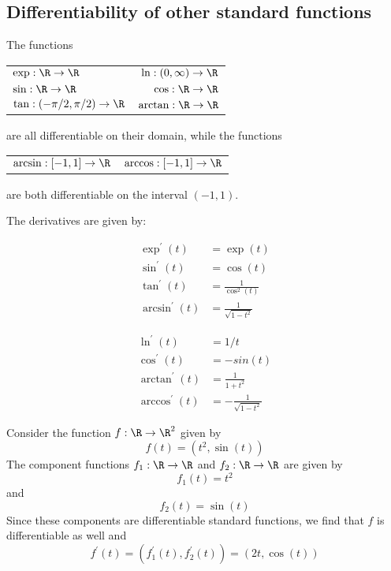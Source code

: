 \subsection{Differentiability of other standard functions}
\begin{proposition}
    The functions
    \begin{center}
        \begin{tabular}{l r}
            $\exp:\R\to\R$ & $\ln:(0,\infty) \to \R$ \\
            $\sin:\R\to\R$ & $\cos:\R\to\R$ \\
            $\tan:(-\pi/2,\pi/2)\to\R$ & $\arctan:\R\to\R$
        \end{tabular}
    \end{center}
    are all differentiable on their domain, while the functions
    \begin{center}
        \begin{tabular}{l r}
            $\arcsin:[-1,1] \to \R$ & $\arccos:[-1,1] \to \R$
        \end{tabular}
    \end{center}
    are both differentiable on the interval $(-1,1)$.

    The derivatives are given by: \newline
    \begin{minipage}{.5\linewidth}
        \begin{align*}
            \exp^\prime(t) &= \exp(t) \\
            \sin^\prime(t) &= \cos(t) \\
            \tan^\prime(t) &= \frac{1}{\cos^2(t)} \\
            \arcsin^\prime(t) &= \frac{1}{\sqrt{1-t^2}}
        \end{align*}
    \end{minipage}
    \begin{minipage}{.5\linewidth}
        \begin{align*}
            \ln^\prime(t) &= 1/t \\
            \cos^\prime(t) &= -sin(t) \\
            \arctan^\prime(t) &= \frac{1}{1+t^2} \\
            \arccos^\prime(t) &= -\frac{1}{\sqrt{1-t^2}}
        \end{align*}
    \end{minipage}
\end{proposition}

\begin{example}
    Consider the function $f: \R \to \R^2$ given by 
    $$f(t) = (t^2, \sin(t))$$
    The component functions $f_1:\R \to \R$ and $f_2:\R\to\R$ are given by
    $$f_1(t) = t^2$$ 
    and 
    $$f_2(t) = \sin(t)$$ 
    Since these components are differentiable standard functions, we find that
    $f$ is differentiable as well and 
    $$f^\prime(t) = (f^\prime_1(t),f^\prime_2(t)) = (2t,\cos(t))$$
\end{example}
